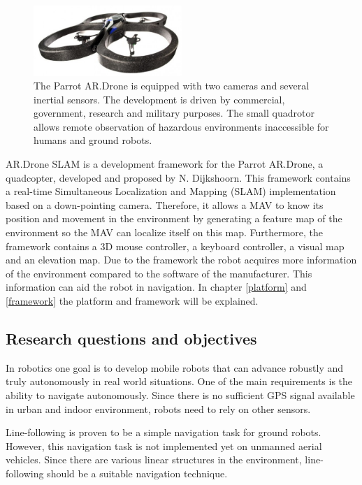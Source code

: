 \documentclass[a4paper]{article}
\begin{document}
\begin{figure}[!ht]
	\centering
	\includegraphics[width=0.5\textwidth]{images/ardrone.jpg}
	\caption{The Parrot AR.Drone is equipped with two cameras and several inertial sensors. The development is driven by commercial, government, research and military purposes. The small quadrotor allows remote observation of hazardous environments inaccessible for humans and ground robots.}
	\label{ardrone}
\end{figure}

AR.Drone SLAM \cite{Dijkshoorn2012} is a development framework for the Parrot AR.Drone, a quadcopter, developed and proposed by N. Dijkshoorn. This framework contains a real-time Simultaneous Localization and Mapping (SLAM) implementation based on a down-pointing camera. Therefore, it allows a MAV to know its position and movement in the environment by generating a feature map of the environment so the MAV can localize itself on this map. Furthermore, the framework contains a 3D mouse controller, a keyboard controller, a visual map and an elevation map. Due to the framework the robot acquires more information of the environment compared to the software of the manufacturer. This information can aid the robot in navigation. In chapter \ref{platform} and \ref{framework} the platform and framework will be explained.

\subsection{Research questions and objectives}
\label{researchquestion}
In robotics one goal is to develop mobile robots that can advance robustly and truly autonomously in real world situations. One of the main requirements is the ability to navigate autonomously. Since there is no sufficient GPS signal available in urban and indoor environment, robots need to rely on other sensors.

Line-following is proven to be a simple navigation task for ground robots. However, this navigation task is not implemented yet on unmanned aerial vehicles. Since there are various linear structures in the environment, line-following should be a suitable navigation technique.
\end{document}
